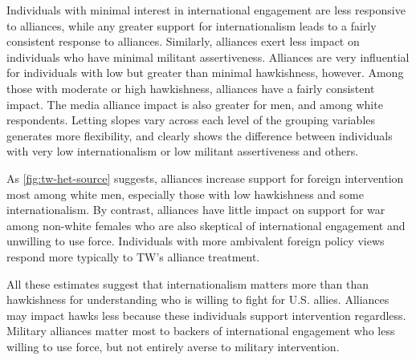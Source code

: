 \documentclass[12pt]{article}
\begin{document}
Individuals with minimal interest in international engagement are less responsive to alliances, while any greater support for internationalism leads to a fairly consistent response to alliances. 
Similarly, alliances exert less impact on individuals who have minimal militant assertiveness. 
Alliances are very influential for individuals with low but greater than minimal hawkishness, however. 
Among those with moderate or high hawkishness, alliances have a fairly consistent impact. 
The media alliance impact is also greater for men, and among white respondents. 
Letting slopes vary across each level of the grouping variables generates more flexibility, and clearly shows the difference between individuals with very low internationalism or low militant assertiveness and others. 


As \autoref{fig:tw-het-source} suggests, alliances increase support for foreign intervention most among white men, especially those with low hawkishness and some internationalism.
By contrast, alliances have little impact on support for war among non-white females who are also skeptical of international engagement and unwilling to use force.
Individuals with more ambivalent foreign policy views respond more typically to TW's alliance treatment. 


All these estimates suggest that internationalism matters more than than hawkishness for understanding who is willing to fight for U.S. allies. 
Alliances may impact hawks less because these individuals support intervention regardless. 
Military alliances matter most to backers of international engagement who less willing to use force, but not entirely averse to military intervention.
\end{document}
